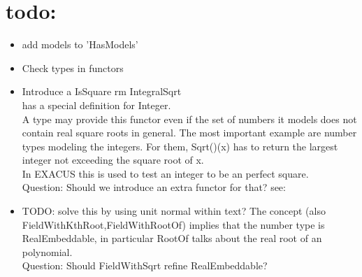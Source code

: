 


\section{todo:}
\begin{itemize} 
\item add models to 'HasModels'
\item Check types in functors 
\item Introduce a IsSquare  rm IntegralSqrt\\
       has a special definition for Integer. \\
        A type may provide this functor even if the set of 
        numbers it models does not contain real square roots in general. 
        The most important example are number types modeling the integers. 
        For them, Sqrt()(x) has to return the largest integer not exceeding 
        the square root of x.\\
        In EXACUS this is used to test an integer to be an perfect square. \\
        Question: Should we introduce an extra functor for that?
        see: 

\item TODO: solve this by using unit normal within text?
      The concept  (also FieldWithKthRoot,FieldWithRootOf) 
      implies that the number type is RealEmbeddable, in particular RootOf talks 
      about the real root of an polynomial.\\
      Question: Should FieldWithSqrt refine RealEmbeddable?
      
\end{itemize}

